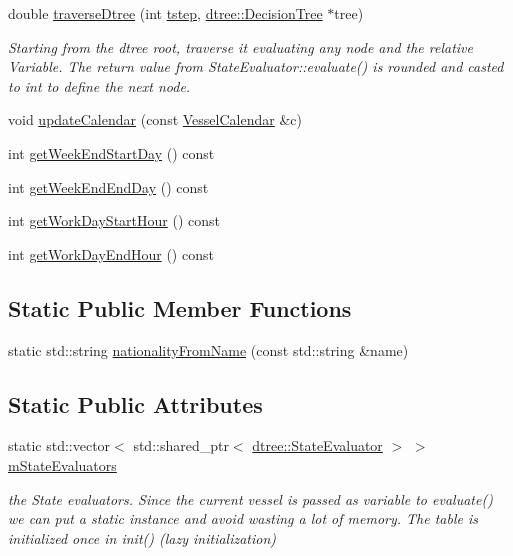 \begin{DoxyCompactItemize}
\item 
double \mbox{\hyperlink{class_vessel_a4416a787bac4131bacb728772c9c1c4b}{traverse\+Dtree}} (int \mbox{\hyperlink{thread__vessels_8cpp_a84bc73d278de929ec9974e1a95d9b23a}{tstep}}, \mbox{\hyperlink{classdtree_1_1_decision_tree}{dtree\+::\+Decision\+Tree}} $\ast$tree)
\begin{DoxyCompactList}\small\item\em Starting from the dtree root, traverse it evaluating any node and the relative Variable. The return value from State\+Evaluator\+::evaluate() is rounded and casted to int to define the next node. \end{DoxyCompactList}\item 
void \mbox{\hyperlink{class_vessel_a4d5efe85094c011209d210539c26f455}{update\+Calendar}} (const \mbox{\hyperlink{struct_vessel_calendar}{Vessel\+Calendar}} \&c)
\item 
int \mbox{\hyperlink{class_vessel_a4c188f3e683cc1271d431475e9427190}{get\+Week\+End\+Start\+Day}} () const
\item 
int \mbox{\hyperlink{class_vessel_a8bfde90e9ea63acc8b41e4c96b198965}{get\+Week\+End\+End\+Day}} () const
\item 
int \mbox{\hyperlink{class_vessel_a5afa9db3f23e95a1b68ebba54769bf93}{get\+Work\+Day\+Start\+Hour}} () const
\item 
int \mbox{\hyperlink{class_vessel_a5b3be87f7630f2ad369b0ad69761f3ba}{get\+Work\+Day\+End\+Hour}} () const
\end{DoxyCompactItemize}
\subsection*{Static Public Member Functions}
\begin{DoxyCompactItemize}
\item 
static std\+::string \mbox{\hyperlink{class_vessel_aad9376c3308f8cbfca279d1040830403}{nationality\+From\+Name}} (const std\+::string \&name)
\end{DoxyCompactItemize}
\subsection*{Static Public Attributes}
\begin{DoxyCompactItemize}
\item 
static std\+::vector$<$ std\+::shared\+\_\+ptr$<$ \mbox{\hyperlink{classdtree_1_1_state_evaluator}{dtree\+::\+State\+Evaluator}} $>$ $>$ \mbox{\hyperlink{class_vessel_aac9f97d33be32668e1fd5a5f39b8c84f}{m\+State\+Evaluators}}
\begin{DoxyCompactList}\small\item\em the State evaluators. Since the current vessel is passed as variable to evaluate() we can put a static instance and avoid wasting a lot of memory. The table is initialized once in init() (lazy initialization) \end{DoxyCompactList}\end{DoxyCompactItemize}
